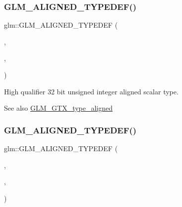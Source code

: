 \subsubsection{\texorpdfstring{G\+L\+M\+\_\+\+A\+L\+I\+G\+N\+E\+D\+\_\+\+T\+Y\+P\+E\+D\+E\+F()}{GLM\_ALIGNED\_TYPEDEF()}\hspace{0.1cm}{\footnotesize\ttfamily [99/209]}}
{\footnotesize\ttfamily glm\+::\+G\+L\+M\+\_\+\+A\+L\+I\+G\+N\+E\+D\+\_\+\+T\+Y\+P\+E\+D\+EF (\begin{DoxyParamCaption}\item[{\mbox{\hyperlink{group__gtc__type__precision_ga8eb85ad460079c63b68866ae34637bda}{highp\+\_\+uint32\+\_\+t}}}]{,  }\item[{aligned\+\_\+highp\+\_\+uint32\+\_\+t}]{,  }\item[{4}]{ }\end{DoxyParamCaption})}

High qualifier 32 bit unsigned integer aligned scalar type. \begin{DoxySeeAlso}{See also}
\mbox{\hyperlink{group__gtx__type__aligned}{G\+L\+M\+\_\+\+G\+T\+X\+\_\+type\+\_\+aligned}} 
\end{DoxySeeAlso}
\mbox{\label{group__gtx__type__aligned_ga71e646f7e301aa422328194162c9c998}} 
\subsubsection{\texorpdfstring{G\+L\+M\+\_\+\+A\+L\+I\+G\+N\+E\+D\+\_\+\+T\+Y\+P\+E\+D\+E\+F()}{GLM\_ALIGNED\_TYPEDEF()}\hspace{0.1cm}{\footnotesize\ttfamily [100/209]}}
{\footnotesize\ttfamily glm\+::\+G\+L\+M\+\_\+\+A\+L\+I\+G\+N\+E\+D\+\_\+\+T\+Y\+P\+E\+D\+EF (\begin{DoxyParamCaption}\item[{\mbox{\hyperlink{group__gtc__type__precision_ga6e66f40c5909bfc872b068187fa6029e}{highp\+\_\+uint64\+\_\+t}}}]{,  }\item[{aligned\+\_\+highp\+\_\+uint64\+\_\+t}]{,  }\item[{8}]{ }\end{DoxyParamCaption})}

